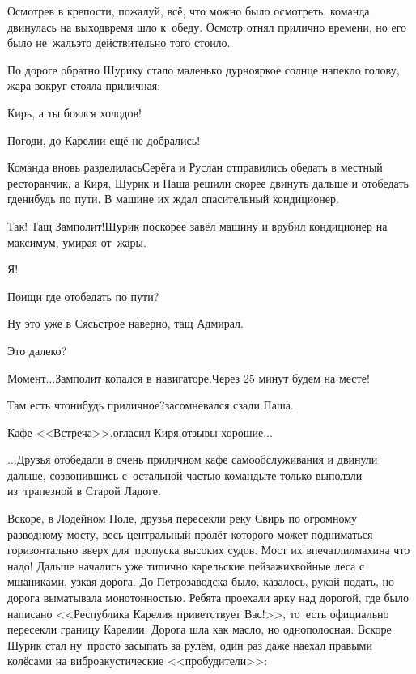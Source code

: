 Осмотрев в крепости, пожалуй, всё, что можно было осмотреть, команда двинулась на выход\mdash время шло к~обеду. Осмотр отнял прилично времени, но его было не~жаль\mdash это действительно того стоило. 

По дороге обратно Шурику стало маленько дурно\mdash яркое солнце напекло голову, жара вокруг стояла приличная:

\diagdash Кирь, а ты боялся холодов!

\diagdash Погоди, до Карелии ещё не добрались!

Команда вновь разделилась\mdash Серёга и Руслан отправились обедать в местный ресторанчик, а Киря, Шурик и Паша решили скорее двинуть дальше и отобедать где\sdash нибудь по пути. В машине их ждал спасительный кондиционер.

\diagdash Так! Тащ Замполит!\mdash Шурик поскорее завёл машину и врубил кондиционер на максимум, умирая от~жары.

\diagdash Я!

\diagdash Поищи где отобедать по пути?%

\diagdash Ну это уже в Сясьстрое наверно, тащ Адмирал.

\diagdash Это далеко?

\diagdash Момент$\ldots$\mdash Замполит копался в навигаторе.\mdash Через 25 минут будем на месте!

\diagdash Там есть что\sdash нибудь приличное?\mdash засомневался сзади Паша.

\diagdash Кафе <<Встреча>>,\mdash огласил Киря,\mdash отзывы хорошие$\ldots$

$\ldots$Друзья отобедали в очень приличном кафе самообслуживания и двинули дальше, созвонившись с~остальной частью команды\mdash те только выползли из~трапезной в Старой Ладоге. 

Вскоре, в Лодейном Поле, друзья пересекли реку Свирь по огромному разводному мосту, весь центральный пролёт которого может подниматься горизонтально вверх для~пропуска высоких судов. Мост их впечатлил\mdash махина что надо! Дальше начались уже типично карельские пейзажи\mdash хвойные леса с мшаниками, узкая дорога. До Петрозаводска было, казалось, рукой подать, но дорога выматывала монотонностью. Ребята проехали арку над дорогой, где было написано <<Республика Карелия приветствует Вас!>>, то~есть официально пересекли границу Карелии. Дорога шла как масло, но однополосная. Вскоре Шурик стал ну~просто засыпать за рулём, один раз даже наехал правыми колёсами на вибро\sdash акустические <<пробудители>>:

